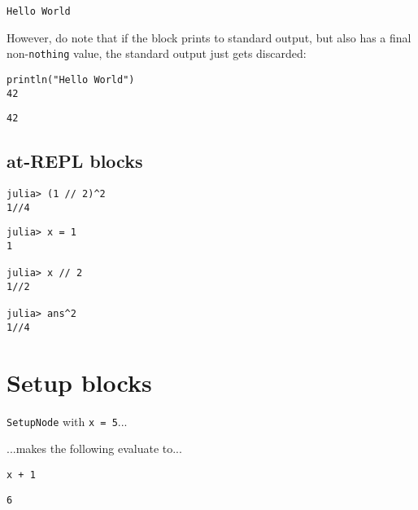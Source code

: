 \begin{lstlisting}
Hello World
\end{lstlisting}



However, do note that if the block prints to standard output, but also has a final non-\texttt{nothing} value, the standard output just gets discarded:




\begin{verbatim}
println("Hello World")
42
\end{verbatim}


\begin{lstlisting}
42
\end{lstlisting}



\subsection{at-REPL blocks}



\label{9794080512499797594}{}



\begin{verbatim}
julia> (1 // 2)^2
1//4
\end{verbatim}




\begin{verbatim}
julia> x = 1
1

julia> x // 2
1//2

julia> ans^2
1//4
\end{verbatim}



\section{Setup blocks}



\label{5969831508618549664}{}


\texttt{SetupNode} with \texttt{x = 5}...





...makes the following evaluate to...




\begin{verbatim}
x + 1
\end{verbatim}


\begin{lstlisting}
6
\end{lstlisting}



